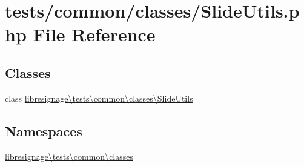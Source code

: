 \hypertarget{SlideUtils_8php}{}\section{tests/common/classes/\+Slide\+Utils.php File Reference}
\label{SlideUtils_8php}
\subsection*{Classes}
\begin{DoxyCompactItemize}
\item 
class \hyperlink{classlibresignage_1_1tests_1_1common_1_1classes_1_1SlideUtils}{libresignage\textbackslash{}tests\textbackslash{}common\textbackslash{}classes\textbackslash{}\+Slide\+Utils}
\end{DoxyCompactItemize}
\subsection*{Namespaces}
\begin{DoxyCompactItemize}
\item 
 \hyperlink{namespacelibresignage_1_1tests_1_1common_1_1classes}{libresignage\textbackslash{}tests\textbackslash{}common\textbackslash{}classes}
\end{DoxyCompactItemize}
